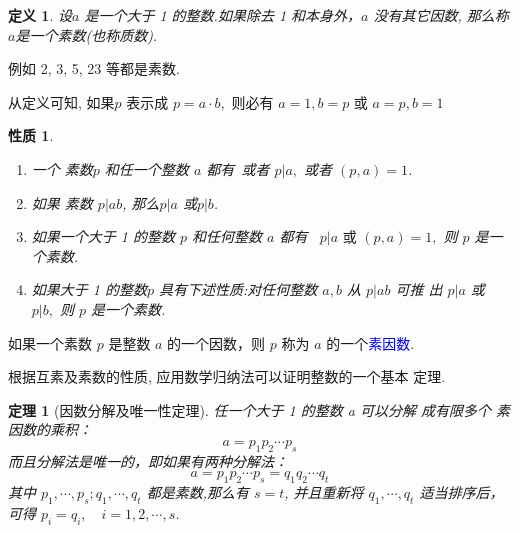 \documentclass[11pt,punct]{ctexbeamer}
\newtheorem{thm}{定理}
\newtheorem*{defi}{定义}
\newtheorem*{prop}{性质}
\newcommand{\blue}{\textcolor{blue}}
\begin{document}
 \begin{frame}


\begin{defi}
	设$a$ 是一个大于 1 的整数.如果除去 1 和本身外，$a$ 没有其它因数, 那么称$a$是一个\alert{素数}(也称质数).
\end{defi}
例如 2, 3, 5, 23 等都是素数.

从定义可知, 如果$p$ 表示成 $p=a \cdot b,$ 则必有 $a=1, b=p$ 或 $a=p, b=1$

\begin{prop}
\begin{enumerate}
\item  一个 素数$p$ 和任一个整数 $a$ 都有~或者 $p | a,$ 或者 $(p, a)=1$.
\item 如果 素数 $p | a  b$, 那么$p | a$ 或$p| b$.
\item  如果一个大于 1  的整数 $p$ 和任何整数 $a$ 都有~  $p | a \text { 或 } (p, a)=1,$ 则 $p$
是一个素数.
\item 如果大于 1 的整数$p$ 具有下述性质:对任何整数 $a , b$ 从 $p | a b$ 可推 出 $p | a$ 或 $p | b,$ 则 $p$ 是一个素数.
\end{enumerate}
\end{prop}
如果一个素数  $p$ 是整数 $a$ 的一个因数，则 $p$ 称为 $a$ 的一个\blue{素因数}.
 \end{frame}


 \begin{frame}
根据互素及素数的性质, 应用数学归纳法可以证明整数的一个基本
定理.
\begin{thm}[因数分解及唯一性定理]
任一个大于 1 的整数 a 可以分解 成有限多个 素因数的乘积：
\[
a=p_{1} p_{2} \cdots p_{s}
\]
而且分解法是唯一的，即如果有两种分解法：
\[
a=p_{1} p_{2} \cdots p_{s}= q_{1} q_{2} \cdots q_{t}
\]
其中 $p_{1}, \cdots, p_{s} ; q_{1}, \cdots, q_{t}$ 都是素数,那么有 $s=t$,  并且重新将 $q_{1}, \cdots, q_{t}$ 适当排序后，可得
$p_{i}=q_{i}, \quad i=1,2, \cdots, s$.
\end{thm}
\end{frame}
\end{document}
